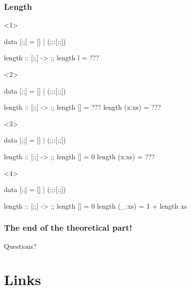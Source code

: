\documentclass[17pt]{beamer}
\renewcommand{\(}[1]{\begin{columns}[#1]}
\renewcommand{\)}{\end{columns}}
\newcommand{\<}[1]{\begin{column}{#1}}
\renewcommand{\>}{\end{column}}
\begin{document}
\begin{frame}[fragile]
\frametitle{Length}
\begin{minipage}[t][.4\textheight]{\textwidth}
\begin{onlyenv}<1>
  \begin{code}
    data [;;] = [] | (;;:[;;])

    length :: [;;] -> ;;
    length l = ???
  \end{code}
\end{onlyenv}
\begin{onlyenv}<2>
  \begin{code}
    data [;;] = [] | (;;:[;;])

    length :: [;;] -> ;;
    length []     = ???
    length (x:xs) = ???
  \end{code}
\end{onlyenv}
\begin{onlyenv}<3>
  \begin{code}
    data [;;] = [] | (;;:[;;])

    length :: [;;] -> ;;
    length []     = 0
    length (x:xs) = ???
  \end{code}
\end{onlyenv}
\begin{onlyenv}<4>
  \begin{code}
    data [;;] = [] | (;;:[;;])

    length :: [;;] -> ;;
    length []     = 0
    length (_:xs) = 1 + length xs
  \end{code}
\end{onlyenv}
\end{minipage}
\begin{minipage}[c][.3\textheight]{\textwidth}
\begin{center}
\end{center}
\end{minipage}
\end{frame}

\begin{frame}
  \frametitle{The end of the theoretical part!}
  \begin{center}
    Questions?
  \end{center}
\end{frame}



\section{Links}
\end{document}
